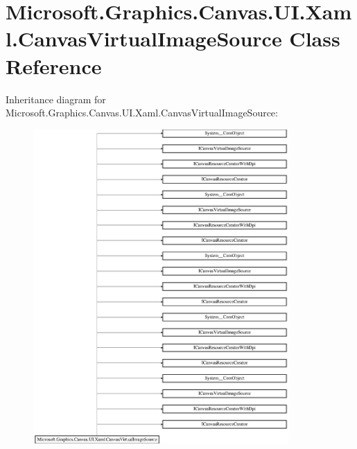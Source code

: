 \hypertarget{class_microsoft_1_1_graphics_1_1_canvas_1_1_u_i_1_1_xaml_1_1_canvas_virtual_image_source}{}\section{Microsoft.\+Graphics.\+Canvas.\+U\+I.\+Xaml.\+Canvas\+Virtual\+Image\+Source Class Reference}
\label{class_microsoft_1_1_graphics_1_1_canvas_1_1_u_i_1_1_xaml_1_1_canvas_virtual_image_source}
Inheritance diagram for Microsoft.\+Graphics.\+Canvas.\+U\+I.\+Xaml.\+Canvas\+Virtual\+Image\+Source\+:\begin{figure}[H]
\begin{center}
\leavevmode
\includegraphics[height=12.000000cm]{class_microsoft_1_1_graphics_1_1_canvas_1_1_u_i_1_1_xaml_1_1_canvas_virtual_image_source}
\end{center}
\end{figure}
